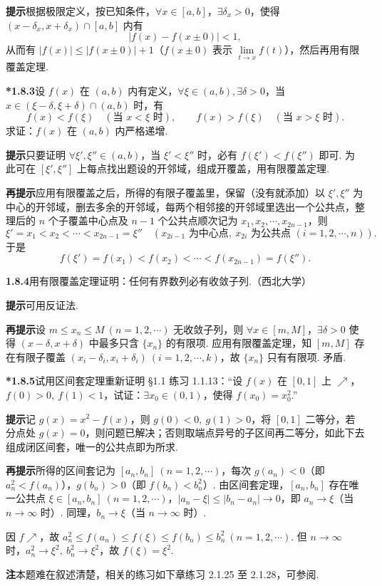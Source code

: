 \documentclass[UTF8, 12pt, fontset=fandol, oneside]{ctexart}
\begin{document}
\noindent\textbf{提示}\quad 根据极限定义，按已知条件，$\forall x\in[a,b]$，$\exists\delta_x>0$，使得 $(x-\delta_x,x+\delta_x)\cap[a,b]$ 内有
\[
  |f(x)-f(x\pm0)|<1,
\]
从而有 $|f(x)|\le |f(x\pm0)|+1$（$f(x\pm0)$ 表示 $\lim\limits_{t\to x}f(t)$），然后再用有限覆盖定理.

\noindent\textbf{*1.8.3}\quad 设 $f(x)$ 在 $(a,b)$ 内有定义，$\forall \xi\in(a,b),\exists\delta>0$，当 $x\in(\xi-\delta,\xi+\delta)\cap(a,b)$ 时，有
\[
  f(x)<f(\xi)\quad(\text{当 }x<\xi\text{ 时}),\qquad
  f(x)>f(\xi)\quad(\text{当 }x>\xi\text{ 时}).
\]
求证：$f(x)$ 在 $(a,b)$ 内严格递增.

\noindent\textbf{提示}\quad 只要证明 $\forall \xi',\xi''\in(a,b)$，当 $\xi'<\xi''$ 时，必有 $f(\xi')<f(\xi'')$ 即可. 为此可在 $[\xi',\xi'']$ 上每点找出题设的开邻域，组成开覆盖，用有限覆盖定理.

\noindent\textbf{再提示}\quad 应用有限覆盖之后，所得的有限子覆盖里，保留（没有就添加）以 $\xi',\xi''$ 为中心的开邻域，删去多余的开邻域，每两个相邻接的开邻域里选出一个公共点，整理后的 $n$ 个子覆盖中心点及 $n-1$ 个公共点顺次记为 $x_1,x_2,\cdots,x_{2n-1}$，则
\[
  \xi'=x_1<x_2<\cdots<x_{2n-1}=\xi''
  \quad(x_{2i-1}\text{ 为中心点},\ x_{2i}\text{ 为公共点 }(i=1,2,\cdots,n)).
\]
于是
\[
  f(\xi')=f(x_1)<f(x_2)<\cdots<f(x_{2n-1})=f(\xi'').
\]

\noindent\textbf{1.8.4}\quad 用有限覆盖定理证明：任何有界数列必有收敛子列.（西北大学）

\noindent\textbf{提示}\quad 可用反证法.

\noindent\textbf{再提示}\quad 设 $m\le x_n\le M\ (n=1,2,\cdots)$ 无收敛子列，则 $\forall x\in[m,M]$，$\exists\delta>0$ 使得 $(x-\delta,x+\delta)$ 中最多只含 $\{x_n\}$ 的有限项. 应用有限覆盖定理，知 $[m,M]$ 存在有限子覆盖 $(x_i-\delta_i,x_i+\delta_i)\ (i=1,2,\cdots,k)$，故 $\{x_n\}$ 只有有限项. 矛盾.

\noindent\textbf{*1.8.5}\quad 试用区间套定理重新证明 §1.1 练习 1.1.13：“设 $f(x)$ 在 $[0,1]$ 上 $\nearrow$，$f(0)>0,\ f(1)<1$，试证：$\exists x_0\in(0,1)$，使得 $f(x_0)=x_0^2$.”

\noindent\textbf{提示}\quad 记 $g(x)=x^2-f(x)$，则 $g(0)<0,\ g(1)>0$，将 $[0,1]$ 二等分，若分点处 $g(x)=0$，则问题已解决；否则取端点异号的子区间再二等分，如此下去组成闭区间套，唯一的公共点即为所求.

\noindent\textbf{再提示}\quad 所得的区间套记为 $[a_n,b_n]\ (n=1,2,\cdots)$，每次 $g(a_n)<0$（即 $a_n^2<f(a_n)$），$g(b_n)>0$（即 $f(b_n)<b_n^2$）. 由区间套定理，$[a_n,b_n]$ 存在唯一公共点 $\xi\in[a_n,b_n]\ (n=1,2,\cdots)$，$|a_n-\xi|\le |b_n-a_n|\to0$，即 $a_n\to\xi$（当 $n\to\infty$ 时）. 同理，$b_n\to\xi$（当 $n\to\infty$ 时）.

因 $f\nearrow$，故 $a_n^2\le f(a_n)\le f(\xi)\le f(b_n)\le b_n^2\ (n=1,2,\cdots)$. 但 $n\to\infty$ 时，$a_n^2\to\xi^2,\ b_n^2\to\xi^2$，故 $f(\xi)=\xi^2$.

\noindent\textbf{注}\quad 本题难在叙述清楚，相关的练习如下章练习 2.1.25 至 2.1.28，可参阅.
\end{document}
